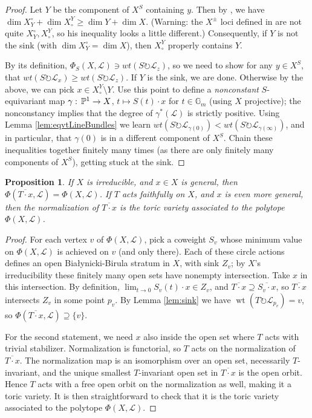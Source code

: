 \documentclass[11pt]{amsart}
\newtheorem{proposition}[Thm]{Proposition}
\theoremstyle{definition}
\DeclareMathOperator{\wt}{wt}
\newcommand{\PP}{\mathbb{P}}
\newcommand\calL{{\mathcal L}}
\newcommand\Gm{{\mathbb G}_m}
\newcommand\actson\circlearrowright
\renewcommand{\colon}{\mathrel{:}}
\renewcommand{\colon}{:\mkern\thinmuskip}
\begin{document}
\begin{proof}
  Let $Y$ be the component of $X^S$ containing $y$. Then by \cite{Konarski},
  we have $\dim X_Y^\circ + \dim X^Y_\circ \geq \dim Y + \dim X$.
  (Warning: the $X^\pm$ loci defined in \cite{Konarski} are not quite
  $X_Y^\circ,X^Y_\circ$, so his inequality looks a little different.)
  Consequently, if $Y$ is not the sink (with $\dim X_Y^\circ = \dim X$),
  then $X^Y_\circ$ properly contains $Y$.

  By its definition, $\Phi_S(X,\calL) \ni wt(S\actson \calL_z)$,
  so we need to show for any $y\in X^S$,
  that $wt(S\actson \calL_x) \geq wt(S\actson \calL_z)$.
  If $Y$ is the sink, we are done. Otherwise by the above,
  we can pick $x \in X^Y_\circ \setminus Y$. Use this point to define a
  {\em nonconstant} $S$-equivariant map
  $\gamma\colon \PP^1 \to X$, $t \mapsto S(t)\cdot x$
  for $t\in\Gm$ (using $X$ projective); the nonconstancy implies that
  the degree of $\gamma^*(\calL)$ is strictly positive.
  Using Lemma \ref{lem:eqvtLineBundles}
  we learn $wt(S\actson \calL_{\gamma(0)}) < wt(S\actson \calL_{\gamma(\infty)})$,
  and in particular, that $\gamma(0)$ is in a different component of $X^S$.
  Chain these inequalities together finitely many times (as there are
  only finitely many components of $X^S$), getting stuck at the sink.
\end{proof}

\begin{proposition}\label{prop:TorbitClosure}
  If $X$ is irreducible, and $x\in X$ is general, then
  $\Phi\left(\overline{T\cdot x}, \calL\right) = \Phi(X, \calL)$.
  If $T$ acts faithfully on $X$, and $x$ is even more general,
  then the normalization of $\overline{T\cdot x}$ is the
  toric variety associated to the polytope $\Phi(X, \calL)$.
\end{proposition}

\begin{proof}
  For each vertex $v$ of $\Phi(X, \calL)$, pick a coweight $S_v$
  whose minimum value on $\Phi(X, \calL)$ is achieved on $v$ (and only there).
  Each of these circle actions defines an open Bia\l ynicki-Birula
  stratum in $X$, with sink $Z_v$; by $X$'s irreducibility these
  finitely many open sets have nonempty intersection. Take $x$ in this
  intersection. By definition, $\lim_{t\to 0} S_v(t)\cdot x \in Z_v$, and
  $\overline{T\cdot x} \supseteq \overline{S_v\cdot x}$,
  so $\overline{T\cdot x}$ intersects $Z_v$ in some point $p_v$.
  By Lemma \ref{lem:sink} we have $\wt(T\actson \calL_{p_v}) = v$,
  so $\Phi\left(\overline{T\cdot x},\calL\right) \supseteq \{v\}$.

  For the second statement, we need $x$ also inside the open set where
  $T$ acts with trivial stabilizer. Normalization is functorial,
  so $T$ acts on the normalization of $\overline{T \cdot x}$.
  The normalization map
  is an isomorphism over an open set, necessarily $T$-invariant,
  and the unique smallest $T$-invariant open set in $\overline{T\cdot x}$
  is the open orbit. Hence $T$ acts with a free open orbit on the
  normalization as well, making it a toric variety. It is then
  straightforward to check that it is the toric variety associated
  to the polytope $\Phi(X,\calL)$.
\end{proof}
\end{document}
